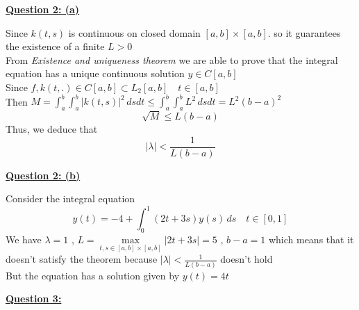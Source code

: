 \documentclass[]{article}
\begin{document}
\textbf{\underline{Question 2: (a)}}
\begin{adjustwidth}{1cm}{2cm}
Since $k(t,s)$ is continuous on closed domain $[a,b]\times[a,b]$. so it guarantees the existence of a finite  $L>0$\\
From \textit{Existence and uniqueness theorem} we are able to prove that the integral equation has a unique continuous solution $y\in C[a,b]$\\
Since $f,k(t,.) \in C[a,b] \subset L_2[a,b] \quad t \in [a,b]$\\
Then $M = \int_a^b \int_a^b |k(t,s)|^2 \, ds dt \leq \int_a^b \int_a^b L^2 \, ds dt = L^2 (b-a)^2 $\\
$$\sqrt{M} \leq L(b-a)$$
Thus, we deduce that
$$|\lambda| < \frac{1}{L(b-a)}$$
\end{adjustwidth}
\textbf{\underline{Question 2: (b)}}
\begin{adjustwidth}{1cm}{2cm}
Consider the integral equation 
\[
y(t) = -4 + \int_{0}^{1}(2t+3s)y(s) \,ds \quad t \in [0,1]
\]
We have $\lambda = 1$ , $L = \max\limits_{t,s\in [a,b]\times[a,b]} |2t+3s| = 5$ , $b-a = 1$
which means that it doesn't satisfy the theorem because $\displaystyle |\lambda|< \frac{1}{L(b-a)}$ doesn't hold 
\\
But  the equation has a solution given by $y(t) = 4t$
\end{adjustwidth}
\textbf{\underline{Question 3:}}
\end{document}
